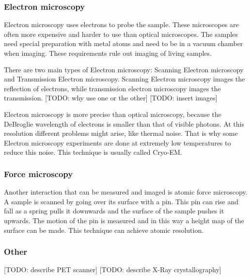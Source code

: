 \subsubsection{Electron microscopy}

Electron microscopy uses electrons to probe the sample. These
microscopes are often more expensive and harder to use than optical
microscopes. The samples need special preparation with metal atoms and
need to be in a vacuum chamber when imaging. These requirements rule
out imaging of living samples.

There are two main types of Electron microscopy: Scanning Electron
microscopy and Transmission Electron microscopy. Scanning Electron
microscopy images the reflection of electrons, while transmission
electron microscopy images the transmission. [TODO: why use one or the other] [TODO: insert images]

Electron microscopy is more precise than optical microscopy, because
the DeBroglie wavelength of electrons is smaller than that of visible
photons. At this resolution different problems might arise, like
thermal noise. That is why some Electron microscopy experiments are
done at extremely low temperatures to reduce this noise. This
technique is usually called Cryo-EM.

\subsubsection{Force microscopy}

Another interaction that can be measured and imaged is atomic force
microscopy. A sample is scanned by going over its surface with a
pin. This pin can rise and fall as a spring pulls it downwards and the
surface of the sample pushes it upwards. The motion of the pin is
measured and in this way a height map of the surface can be made. This
technique can achieve atomic resolution.

\subsubsection{Other}

[TODO: describe PET scanner]
[TODO: describe X-Ray crystallography]
